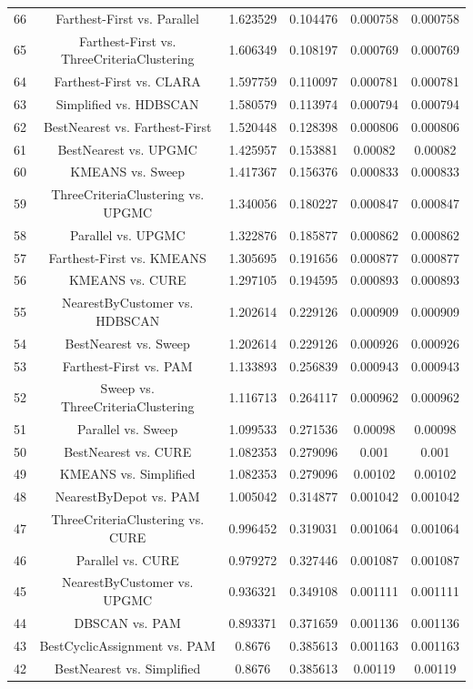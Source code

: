 \documentclass[a4paper,10pt]{article}
\begin{document}
\begin{landscape}
\begin{table}[!htp]
\begin{tabular}{cccccc}
66&Farthest-First vs. Parallel&1.623529&0.104476&0.000758&0.000758\\
65&Farthest-First vs. ThreeCriteriaClustering&1.606349&0.108197&0.000769&0.000769\\
64&Farthest-First vs. CLARA&1.597759&0.110097&0.000781&0.000781\\
63&Simplified vs. HDBSCAN&1.580579&0.113974&0.000794&0.000794\\
62&BestNearest vs. Farthest-First&1.520448&0.128398&0.000806&0.000806\\
61&BestNearest vs. UPGMC&1.425957&0.153881&0.00082&0.00082\\
60&KMEANS vs. Sweep&1.417367&0.156376&0.000833&0.000833\\
59&ThreeCriteriaClustering vs. UPGMC&1.340056&0.180227&0.000847&0.000847\\
58&Parallel vs. UPGMC&1.322876&0.185877&0.000862&0.000862\\
57&Farthest-First vs. KMEANS&1.305695&0.191656&0.000877&0.000877\\
56&KMEANS vs. CURE&1.297105&0.194595&0.000893&0.000893\\
55&NearestByCustomer vs. HDBSCAN&1.202614&0.229126&0.000909&0.000909\\
54&BestNearest vs. Sweep&1.202614&0.229126&0.000926&0.000926\\
53&Farthest-First vs. PAM&1.133893&0.256839&0.000943&0.000943\\
52&Sweep vs. ThreeCriteriaClustering&1.116713&0.264117&0.000962&0.000962\\
51&Parallel vs. Sweep&1.099533&0.271536&0.00098&0.00098\\
50&BestNearest vs. CURE&1.082353&0.279096&0.001&0.001\\
49&KMEANS vs. Simplified&1.082353&0.279096&0.00102&0.00102\\
48&NearestByDepot vs. PAM&1.005042&0.314877&0.001042&0.001042\\
47&ThreeCriteriaClustering vs. CURE&0.996452&0.319031&0.001064&0.001064\\
46&Parallel vs. CURE&0.979272&0.327446&0.001087&0.001087\\
45&NearestByCustomer vs. UPGMC&0.936321&0.349108&0.001111&0.001111\\
44&DBSCAN vs. PAM&0.893371&0.371659&0.001136&0.001136\\
43&BestCyclicAssignment vs. PAM&0.8676&0.385613&0.001163&0.001163\\
42&BestNearest vs. Simplified&0.8676&0.385613&0.00119&0.00119\\

\end{tabular}
\end{table}
\end{landscape}
\end{document}
